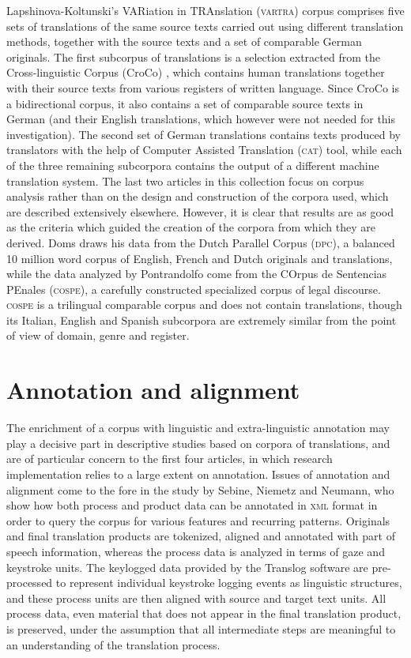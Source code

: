 \documentclass[output=paper]{LSP/langsci}
\begin{document}
Lapshinova-Koltunski’s VARiation in TRAnslation  (\textsc{vartra}) corpus comprises five sets of translations of the same source texts carried out using different translation methods, together with the source texts and a set of comparable German originals. The first subcorpus of translations is a selection extracted from the Cross-linguistic Corpus (CroCo) \citep{Croco:2013}, which contains human translations together with their source texts from various registers of written language. Since CroCo is a bidirectional corpus, it also contains a set of comparable source texts in German (and their English translations, which however were not needed for this investigation). The second set of German translations contains texts produced by translators with the help of Computer Assisted Translation (\textsc{cat}) tool, while each of the three remaining subcorpora contains the output of a different machine translation system. The last two articles in this collection focus on corpus analysis rather than on the design and construction of the corpora used, which are described extensively elsewhere. However, it is clear that results are as good as the criteria which guided the creation of the corpora from which they are derived. Doms draws his data from the Dutch Parallel Corpus (\textsc{dpc}), a balanced 10 million word corpus of English, French and Dutch originals and translations, while the data analyzed by Pontrandolfo come from the COrpus de Sentencias PEnales (\textsc{cospe}), a carefully constructed specialized corpus of legal discourse. \textsc{cospe} is a trilingual comparable corpus and does not contain translations, though its Italian, English and Spanish subcorpora are extremely similar from the point of view of domain, genre and register.

\section{Annotation and alignment} 
The enrichment of a corpus with linguistic and extra-linguistic annotation may play a decisive part in descriptive studies based on corpora of translations, and are of particular concern to the first four articles, in which research implementation relies to a large extent on annotation. Issues of annotation and alignment come to the fore in the study by Sebine, Niemetz and Neumann, who show how both process and product data can be annotated in \textsc{xml} format in order to query the corpus for various features and recurring patterns. Originals and final translation products are tokenized, aligned and annotated with part of speech information, whereas the process data is analyzed in terms of gaze and keystroke units. The keylogged data provided by the Translog software are pre-processed to represent individual keystroke logging events as linguistic structures, and these process units are then aligned with source and target text units. All process data, even material that does not appear in the final translation product, is preserved, under the assumption that all intermediate steps are meaningful to an understanding of the translation process. 
\end{document}
